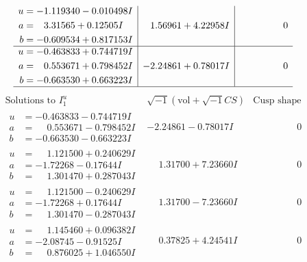 \documentclass[1p]{elsarticle_modified}
\theoremstyle{definition}
\newcommand{\I}{\sqrt{-1}}
\begin{document}
$$\begin{array}{c|c|c}
\begin{aligned}
u &= -1.119340 - 0.010498 I \\
a &= \phantom{-}3.31565 + 0.12505 I \\
b &= -0.609534 + 0.817153 I\end{aligned}
 & \phantom{-}1.56961 + 4.22958 I & \phantom{-0.000000 } 0 \\ \hline\begin{aligned}
u &= -0.463833 + 0.744719 I \\
a &= \phantom{-}0.553671 + 0.798452 I \\
b &= -0.663530 + 0.663223 I\end{aligned}
 & -2.24861 + 0.78017 I & \phantom{-0.000000 } 0\\
 \hline 
 \end{array}$$\newpage$$\begin{array}{c|c|c}  
\text{Solutions to }I^u_{1}& \I (\text{vol} + \sqrt{-1}CS) & \text{Cusp shape}\\
 \hline 
\begin{aligned}
u &= -0.463833 - 0.744719 I \\
a &= \phantom{-}0.553671 - 0.798452 I \\
b &= -0.663530 - 0.663223 I\end{aligned}
 & -2.24861 - 0.78017 I & \phantom{-0.000000 } 0 \\ \hline\begin{aligned}
u &= \phantom{-}1.121500 + 0.240629 I \\
a &= -1.72268 - 0.17644 I \\
b &= \phantom{-}1.301470 + 0.287043 I\end{aligned}
 & \phantom{-}1.31700 + 7.23660 I & \phantom{-0.000000 } 0 \\ \hline\begin{aligned}
u &= \phantom{-}1.121500 - 0.240629 I \\
a &= -1.72268 + 0.17644 I \\
b &= \phantom{-}1.301470 - 0.287043 I\end{aligned}
 & \phantom{-}1.31700 - 7.23660 I & \phantom{-0.000000 } 0 \\ \hline\begin{aligned}
u &= \phantom{-}1.145460 + 0.096382 I \\
a &= -2.08745 - 0.91525 I \\
b &= \phantom{-}0.876025 + 1.046550 I\end{aligned}
 & \phantom{-}0.37825 + 4.24541 I & \phantom{-0.000000 } 0 \\ \hline\begin{aligned}

\end{aligned}
\end{array}$$
\end{document}
